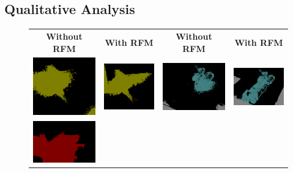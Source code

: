 \subsection{Qualitative Analysis}
\begin{figure}[H]
  \centering
  \setlength{\tabcolsep}{0.5pt} %
  \renewcommand{\arraystretch}{0.4}

  \begin{tabular}{c c c c}
    \textbf{Without RFM} & \textbf{With RFM} & \hspace{4pt} \textbf{Without RFM} & \textbf{With RFM} \\
    [2pt]
    \includegraphics[width=0.18\linewidth, height=0.18\linewidth]{figures/ablation/withoutrfm/2008_001185_[2]} &
    \includegraphics[width=0.18\linewidth, height=0.18\linewidth]{figures/ablation/withrfm/2008_001185_[2]} & \hspace{2pt}
    \includegraphics[width=0.18\linewidth, height=0.18\linewidth]{figures/ablation/withoutrfm/2008_007558_[6, 13]} &
    \includegraphics[width=0.18\linewidth, height=0.18\linewidth]{figures/ablation/withrfm/2008_007558_[6, 13]} \\
    [1mm]
    \includegraphics[width=0.18\linewidth, height=0.18\linewidth]{figures/ablation/withoutrfm/2011_001753_[0]} &

\end{tabular}
\end{figure}
